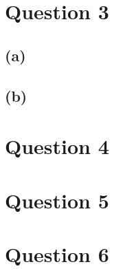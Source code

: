 \documentclass{article}
\begin{document}
\section*{\hfil Question 3}
\subsection*{(a)}

\subsection*{(b)}
\section*{\hfil Question 4}
\section*{\hfil Question 5}
\section*{\hfil Question 6}
\end{document}
